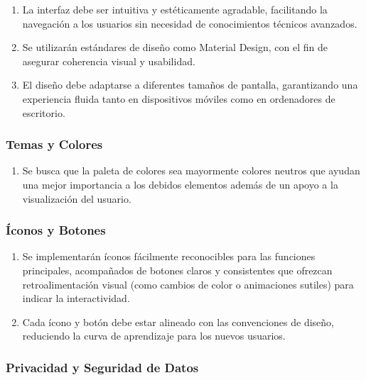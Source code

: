 	\begin{enumerate}
		\item La interfaz debe ser intuitiva y estéticamente agradable, facilitando
			la navegación a los usuarios sin necesidad de conocimientos técnicos
			avanzados.

		\item Se utilizarán estándares de diseño como Material Design, con el fin de
			asegurar coherencia visual y usabilidad.

		\item El diseño debe adaptarse a diferentes tamaños de pantalla,
			garantizando una experiencia fluida tanto en dispositivos móviles como en
			ordenadores de escritorio.
	\end{enumerate}

	\subsubsection{Temas y Colores}

	\begin{enumerate}
		\item Se busca que la paleta de colores sea mayormente colores neutros que ayudan
			una mejor importancia a los debidos elementos además de un apoyo a la visualización
			del usuario.
	\end{enumerate}

	\subsubsection{Íconos y Botones}

	\begin{enumerate}
		\item Se implementarán íconos fácilmente reconocibles para las funciones principales,
			acompañados de botones claros y consistentes que ofrezcan
			retroalimentación visual (como cambios de color o animaciones sutiles)
			para indicar la interactividad.

		\item Cada ícono y botón debe estar alineado con las convenciones de diseño,
			reduciendo la curva de aprendizaje para los nuevos usuarios.
	\end{enumerate}

	\subsubsection{Privacidad y Seguridad de Datos}

